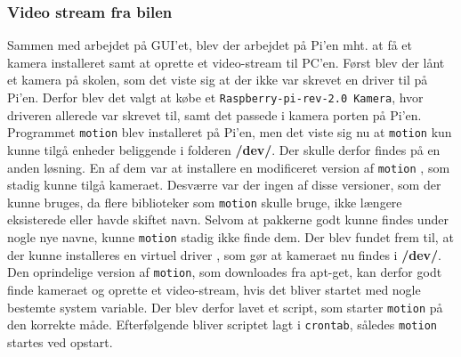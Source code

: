 \subsubsection{Video stream fra bilen}

Sammen med arbejdet på GUI’et, blev der arbejdet på Pi’en mht. at få et kamera installeret samt at oprette et video-stream til PC'en. 
Først blev der lånt et kamera på skolen, som det viste sig at der ikke var skrevet en driver til på Pi'en. 
Derfor blev det valgt at købe et \texttt{Raspberry-pi-rev-2.0 Kamera}, hvor driveren allerede var skrevet til, samt det passede i kamera porten på Pi’en. 
Programmet \texttt{motion} blev installeret på Pi’en, men det viste sig nu at \texttt{motion} kun kunne tilgå enheder beliggende i folderen \textbf{\//dev/}. 
Der skulle derfor findes på en anden løsning. 
En af dem var at installere en modificeret version af \texttt{motion} \cite{lib:motion-on-raspberry}, som stadig kunne tilgå kameraet. 
Desværre var der ingen af disse versioner, som der kunne bruges, da flere biblioteker som \texttt{motion} skulle bruge, ikke længere eksisterede eller havde skiftet navn. 
Selvom at pakkerne godt kunne findes under nogle nye navne, kunne \texttt{motion} stadig ikke finde dem. 
Der blev fundet frem til, at der kunne installeres en virtuel driver \cite{lib:camera-driver}, som gør at kameraet nu findes i \textbf{\//dev/}. 
Den oprindelige version af \texttt{motion}, som downloades fra apt-get, kan derfor godt finde kameraet og oprette et video-stream, hvis det bliver startet med nogle bestemte system variable. 
Der blev derfor lavet et script, som starter \texttt{motion} på den korrekte måde. 
Efterfølgende bliver scriptet lagt i \texttt{crontab}, således \texttt{motion} startes ved opstart. 